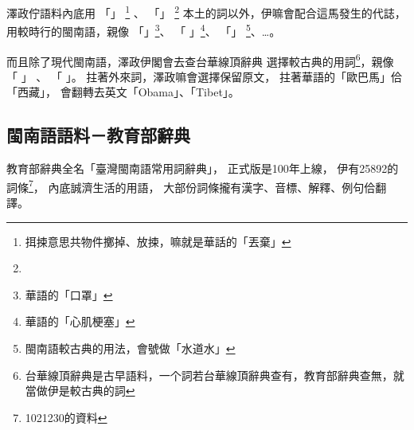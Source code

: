 澤政佇語料內底用
「」
\footnote{挕捒意思共物件擲掉、放捒，嘛就是華話的「丟棄」
}
、
「」
\footnote{
}
本土的詞以外，伊嘛會配合這馬發生的代誌，用較時行的閩南語，親像
「」\footnote{華語的「口罩」}、
「
」\footnote{華語的「心肌梗塞」}、
「」
\footnote{閩南語較古典的用法，會號做「水道水」}、…。

而且除了現代閩南語，澤政伊閣會去查台華線頂辭典\cite{台華線頂辭典}
選擇較古典的用詞\footnote{台華線頂辭典是古早語料，一个詞若台華線頂辭典查有，教育部辭典查無，就當做伊是較古典的詞}，親像
「
」
、
「
」。
拄著外來詞，澤政嘛會選擇保留原文，
拄著華語的「歐巴馬」佮「西藏」，
會翻轉去英文「Obama」、「Tibet」。


\subsection{閩南語語料－教育部辭典}
\label{節：教育部辭典}
教育部辭典全名「臺灣閩南語常用詞辭典」\cite{教育部臺灣閩南語常用詞辭典}，
正式版是100年上線，
伊有25892的詞條\footnote{1021230的資料}，
內底誠濟生活的用語，
大部份詞條攏有漢字、音標、解釋、例句佮翻譯。

